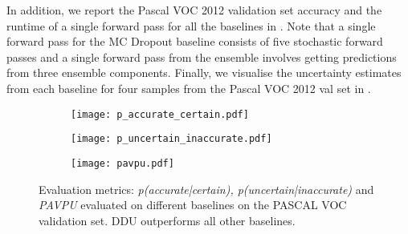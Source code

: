 \documentclass{article}
\begin{document}
In addition, we report the Pascal VOC 2012 validation set accuracy and the runtime of a single forward pass for all the baselines in . Note that a single forward pass for the MC Dropout baseline consists of five stochastic forward passes and a single forward pass from the ensemble involves getting predictions from three ensemble components. Finally, we visualise the uncertainty estimates from each baseline for four samples from the Pascal VOC 2012 val set in .
\begin{figure*}[t]
    \centering
    \begin{subfigure}{0.30\linewidth}
        \texttt{[image: p\_accurate\_certain.pdf]}
        \label{fig:p_acc_cert}
    \end{subfigure}
    \begin{subfigure}{0.30\linewidth}
        \centering
        \texttt{[image: p\_uncertain\_inaccurate.pdf]}
        \label{fig:p_unc_inacc}
    \end{subfigure}
    \begin{subfigure}{0.30\linewidth}
        \centering
        \texttt{[image: pavpu.pdf]}
        \label{fig:pavpu}
    \end{subfigure}
    \vspace{-3mm}
    \caption{
    Evaluation metrics: \emph{p(accurate|certain), p(uncertain|inaccurate)} and \emph{PAVPU} evaluated on different baselines on the PASCAL VOC validation set. DDU outperforms all other baselines.
    }
    \label{fig:3_metrics}
    \vspace{-3mm}
\end{figure*}
\end{document}
